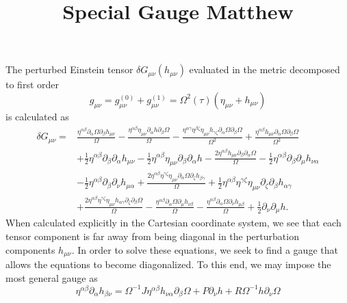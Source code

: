 \documentclass[10pt,letterpaper]{article}
\title{Special Gauge Matthew}
\date{}
\begin{document}
\maketitle
\noindent
The perturbed Einstein tensor $\delta  G_{\mu\nu}( h_{\mu\nu})$ evaluated in the metric decomposed to first order 
\begin{equation}
g_{\mu\nu} = g^{(0)}_{\mu\nu} + g^{(1)}_{\mu\nu} = \Omega^2(\tau)(\eta_{\mu\nu}+h_{\mu\nu})
\end{equation}
is calculated as 
\begin{align}
\delta G_{\mu\nu} ={}&\frac{\eta^{\alpha \beta} \partial_{\alpha}\Omega \partial_{\beta}h_{\mu \nu}}{\Omega}
 -  \frac{\eta^{\alpha \beta} \eta_{\mu \nu} \partial_{\alpha}h \partial_{\beta}\Omega}{\Omega}
 -  \frac{\eta^{\alpha \gamma} \eta^{\beta \zeta} \eta_{\mu \nu} h_{\gamma \zeta} \partial_{\alpha}\Omega \partial_{\beta}\Omega}{\Omega^2}
 + \frac{\eta^{\alpha \beta} h_{\mu \nu} \partial_{\alpha}\Omega \partial_{\beta}\Omega}{\Omega^2}\nonumber\\
& + \tfrac{1}{2} \eta^{\alpha \beta} \partial_{\beta}\partial_{\alpha}h_{\mu \nu}
 -  \tfrac{1}{2} \eta^{\alpha \beta} \eta_{\mu \nu} \partial_{\beta}\partial_{\alpha}h
 -  \frac{2 \eta^{\alpha \beta} h_{\mu \nu} \partial_{\beta}\partial_{\alpha}\Omega}{\Omega}
 -  \tfrac{1}{2} \eta^{\alpha \beta} \partial_{\beta}\partial_{\mu}h_{\nu \alpha}\nonumber\\
& -  \tfrac{1}{2} \eta^{\alpha \beta} \partial_{\beta}\partial_{\nu}h_{\mu \alpha}
 + \frac{2 \eta^{\alpha \beta} \eta^{\gamma \zeta} \eta_{\mu \nu} \partial_{\alpha}\Omega \partial_{\zeta}h_{\beta \gamma}}{\Omega}
 + \tfrac{1}{2} \eta^{\alpha \beta} \eta^{\gamma \zeta} \eta_{\mu \nu} \partial_{\zeta}\partial_{\beta}h_{\alpha \gamma}\nonumber\\
& + \frac{2 \eta^{\alpha \beta} \eta^{\gamma \zeta} \eta_{\mu \nu} h_{\alpha \gamma} \partial_{\zeta}\partial_{\beta}\Omega}{\Omega}
 -  \frac{\eta^{\alpha \beta} \partial_{\alpha}\Omega \partial_{\mu}h_{\nu \beta}}{\Omega}
 -  \frac{\eta^{\alpha \beta} \partial_{\alpha}\Omega \partial_{\nu}h_{\mu \beta}}{\Omega}
 + \tfrac{1}{2} \partial_{\nu}\partial_{\mu}h.
\end{align}
When calculated explicitly in the Cartesian coordinate system, we see that each tensor component is far away from being diagonal in the perturbation components $h_{\mu\nu}$. In order to solve these equations, we seek to find a gauge that allows the equations to become diagonalized. To this end, we may impose the most general gauge as
\begin{equation}
	\eta^{\alpha\beta}\partial_{\alpha}h_{\beta\nu} = \Omega^{-1} J \eta^{\alpha\beta}h_{\nu\alpha}\partial_\beta \Omega + P \partial_\nu h + R \Omega^{-1} h \partial_\nu \Omega
\end{equation}
\end{document}
